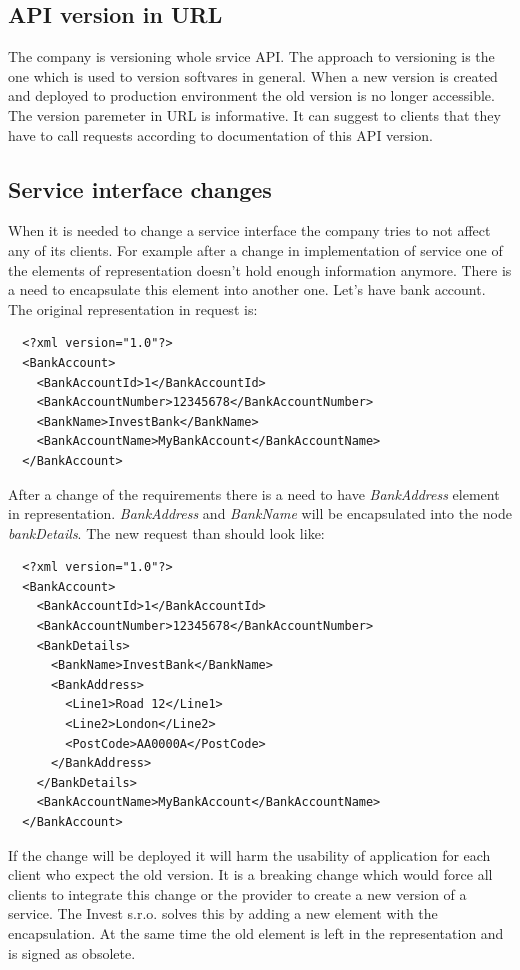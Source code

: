 \subsection{API version in URL}
The company is versioning whole srvice API. The approach to versioning is the one which is used to version softvares in general. When a new version is created and deployed to production environment the old version is no longer accessible. The version paremeter in URL is informative. It can suggest to clients that they have to call requests according to \gls{documentation} of this API version.

\subsection{Service interface changes}
When it is needed to change a service interface the company tries to not affect any of its clients. For example after a change in implementation of service one of the elements of representation doesn't hold enough information anymore. There is a need to encapsulate this element into another one. Let's have bank account. The original representation in request is:

\begin{lstlisting}
  <?xml version="1.0"?>
  <BankAccount>
    <BankAccountId>1</BankAccountId>
    <BankAccountNumber>12345678</BankAccountNumber>
    <BankName>InvestBank</BankName>
    <BankAccountName>MyBankAccount</BankAccountName>
  </BankAccount>
\end{lstlisting}

After a change of the requirements there is a need to have \emph{BankAddress} element in representation. \emph{BankAddress} and \emph{BankName} will be encapsulated into the node \emph{bankDetails}. The new request than should look like:

\begin{lstlisting}
  <?xml version="1.0"?>
  <BankAccount>
    <BankAccountId>1</BankAccountId>
    <BankAccountNumber>12345678</BankAccountNumber>
    <BankDetails>
      <BankName>InvestBank</BankName>
      <BankAddress>
        <Line1>Road 12</Line1>
        <Line2>London</Line2>
        <PostCode>AA0000A</PostCode>
      </BankAddress>
    </BankDetails>
    <BankAccountName>MyBankAccount</BankAccountName>
  </BankAccount>
\end{lstlisting}

If the change will be deployed it will harm the usability of application for each client who expect the old version. It is a breaking change which would force all clients to integrate this change or the provider to create a new version of a service. The Invest s.r.o. solves this by adding a new element with the encapsulation. At the same time the old element is left in the representation and is signed as obsolete.

